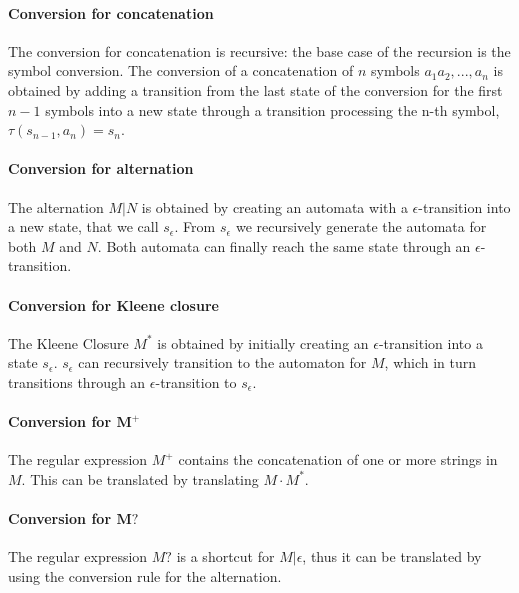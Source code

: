 \paragraph{Conversion for concatenation}
The conversion for concatenation is recursive: the base case of the recursion is the symbol conversion. The conversion of a concatenation of $n$ symbols $a_{1}a_{2}, ..., a_{n}$ is obtained by adding a transition from the last state of the conversion for the first $n - 1$ symbols into a new state through a transition processing the n-th symbol, $\tau(s_{n - 1},a_{n}) = s_{n}$.

\paragraph{Conversion for alternation}
The alternation $M | N$ is obtained by creating an automata with a $\epsilon$-transition into a new state, that we call $s_{\epsilon}$. From $s_{\epsilon}$ we recursively generate the automata for both $M$ and $N$. Both automata can finally reach the same state through an $\epsilon$-transition.

\paragraph{Conversion for Kleene closure}
The Kleene Closure $M^{*}$ is obtained by initially creating an $\epsilon$-transition into a state $s_{\epsilon}$. $s_{\epsilon}$ can recursively transition to the automaton for $M$, which in turn transitions through an $\epsilon$-transition to $s_{\epsilon}$.

\paragraph{Conversion for $\mathbf{M^{+}}$}
The regular expression $M^{+}$ contains the concatenation of one or more strings in $M$. This can be translated by translating $M \cdot M^{*}$.

\paragraph{Conversion for $\mathbf{M?}$}
The regular expression $M?$ is a shortcut for $M|\epsilon$, thus it can be translated by using the conversion rule for the alternation.

